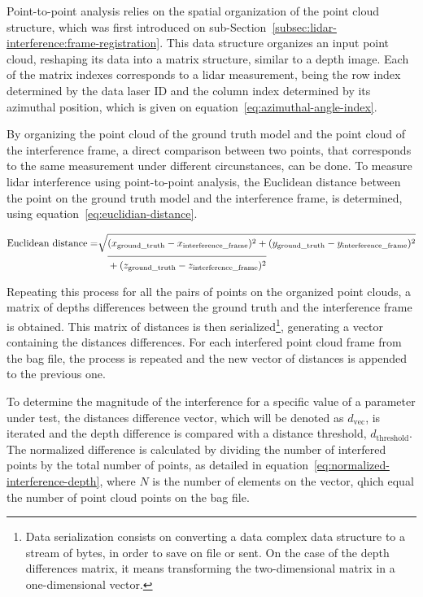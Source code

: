 Point-to-point analysis relies on the spatial organization of the point cloud structure, which was first introduced on sub-Section~\ref{subsec:lidar-interference:frame-registration}. This data structure organizes an input point cloud, reshaping its data into a matrix structure, similar to a depth image. Each of the matrix indexes corresponds to a \ac{lidar} measurement, being the row index determined by the data \ac{laser} ID and the column index determined by its azimuthal position, which is given on equation~\ref{eq:azimuthal-angle-index}. 

By organizing the point cloud of the ground truth model and the point cloud of the interference frame, a direct comparison between two points, that corresponds to the same measurement under different circunstances, can be done. To measure \ac{lidar} interference using point-to-point analysis, the Euclidean distance between the point on the ground truth model and the interference frame, is determined, using equation~\ref{eq:euclidian-distance}.

\begin{equation}
	\label{eq:euclidian-distance}
	\begin{split}
	\displaystyle
	\text{Euclidean distance} = & \sqrt{(x_{\text{ground\_truth}} - x_{\text{interference\_frame}})^2 + (y_{\text{ground\_truth}} - y_{\text{interference\_frame}})^2} \\
															& \displaystyle \quad \overline{\rule{0pt}{2.5ex} + (z_{\text{ground\_truth}} - z_{\text{interference\_frame}})^2 }
	\end{split}
\end{equation}

Repeating this process for all the pairs of points on the organized point clouds, a matrix of depths differences between the ground truth and the interference frame is obtained. This matrix of distances is then serialized\footnote{Data serialization consists on converting a data complex data structure to a stream of bytes, in order to save on file or sent. On the case of the depth differences matrix, it means transforming the two-dimensional matrix in a one-dimensional vector.}, generating a vector containing the distances differences. For each interfered point cloud frame from the bag file, the process is repeated and the new vector of distances is appended to the previous one. 

To determine the magnitude of the interference for a specific value of a parameter under test, the distances difference vector, which will be denoted as $d_\text{vec}$, is iterated and the depth difference is compared with a distance threshold, $d_\text{threshold}$. The normalized difference is calculated by dividing the number of interfered points by the total number of points, as detailed in equation~\ref{eq:normalized-interference-depth}, where $N$ is the number of elements on the vector, qhich equal the number of point cloud points on the bag file.

